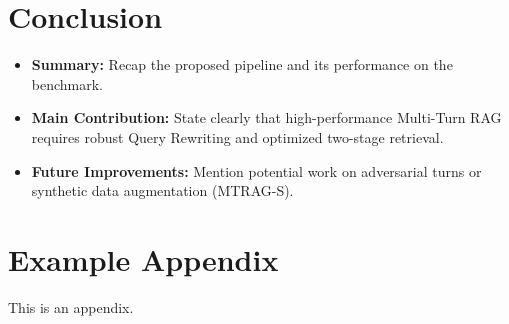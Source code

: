 \documentclass[11pt]{article}
\begin{document}
\section{Conclusion}
\begin{itemize}
    \item \textbf{Summary:} Recap the proposed pipeline and its performance on the benchmark.
    \item \textbf{Main Contribution:} State clearly that high-performance Multi-Turn RAG requires robust Query Rewriting and optimized two-stage retrieval.
    \item \textbf{Future Improvements:} Mention potential work on adversarial turns or synthetic data augmentation (MTRAG-S).
\end{itemize}



\appendix

\section{Example Appendix}
\label{sec:appendix}

This is an appendix.
\end{document}
